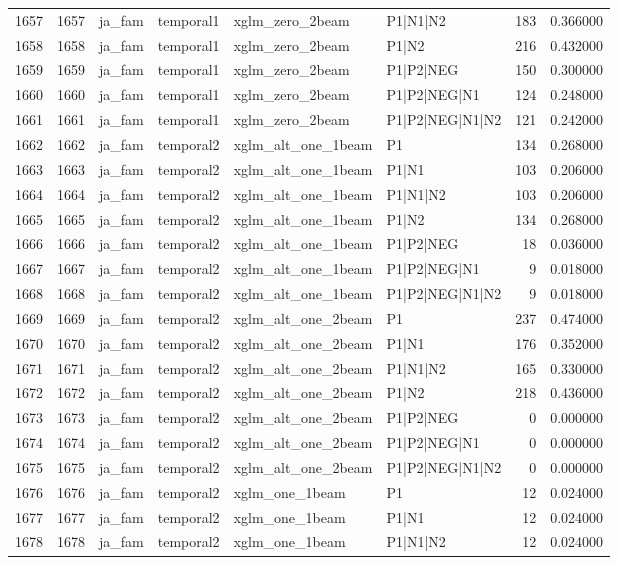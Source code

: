 \begin{tabular}{lrllllrr}
1657 & 1657 & ja_fam & temporal1 & xglm_zero_2beam & P1|N1|N2 & 183 & 0.366000 \\
1658 & 1658 & ja_fam & temporal1 & xglm_zero_2beam & P1|N2 & 216 & 0.432000 \\
1659 & 1659 & ja_fam & temporal1 & xglm_zero_2beam & P1|P2|NEG & 150 & 0.300000 \\
1660 & 1660 & ja_fam & temporal1 & xglm_zero_2beam & P1|P2|NEG|N1 & 124 & 0.248000 \\
1661 & 1661 & ja_fam & temporal1 & xglm_zero_2beam & P1|P2|NEG|N1|N2 & 121 & 0.242000 \\
1662 & 1662 & ja_fam & temporal2 & xglm_alt_one_1beam & P1 & 134 & 0.268000 \\
1663 & 1663 & ja_fam & temporal2 & xglm_alt_one_1beam & P1|N1 & 103 & 0.206000 \\
1664 & 1664 & ja_fam & temporal2 & xglm_alt_one_1beam & P1|N1|N2 & 103 & 0.206000 \\
1665 & 1665 & ja_fam & temporal2 & xglm_alt_one_1beam & P1|N2 & 134 & 0.268000 \\
1666 & 1666 & ja_fam & temporal2 & xglm_alt_one_1beam & P1|P2|NEG & 18 & 0.036000 \\
1667 & 1667 & ja_fam & temporal2 & xglm_alt_one_1beam & P1|P2|NEG|N1 & 9 & 0.018000 \\
1668 & 1668 & ja_fam & temporal2 & xglm_alt_one_1beam & P1|P2|NEG|N1|N2 & 9 & 0.018000 \\
1669 & 1669 & ja_fam & temporal2 & xglm_alt_one_2beam & P1 & 237 & 0.474000 \\
1670 & 1670 & ja_fam & temporal2 & xglm_alt_one_2beam & P1|N1 & 176 & 0.352000 \\
1671 & 1671 & ja_fam & temporal2 & xglm_alt_one_2beam & P1|N1|N2 & 165 & 0.330000 \\
1672 & 1672 & ja_fam & temporal2 & xglm_alt_one_2beam & P1|N2 & 218 & 0.436000 \\
1673 & 1673 & ja_fam & temporal2 & xglm_alt_one_2beam & P1|P2|NEG & 0 & 0.000000 \\
1674 & 1674 & ja_fam & temporal2 & xglm_alt_one_2beam & P1|P2|NEG|N1 & 0 & 0.000000 \\
1675 & 1675 & ja_fam & temporal2 & xglm_alt_one_2beam & P1|P2|NEG|N1|N2 & 0 & 0.000000 \\
1676 & 1676 & ja_fam & temporal2 & xglm_one_1beam & P1 & 12 & 0.024000 \\
1677 & 1677 & ja_fam & temporal2 & xglm_one_1beam & P1|N1 & 12 & 0.024000 \\
1678 & 1678 & ja_fam & temporal2 & xglm_one_1beam & P1|N1|N2 & 12 & 0.024000 \\

\end{tabular}
